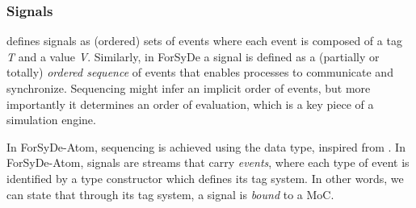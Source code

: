 \subsubsection{Signals}
\cite{Lee98} defines signals as (ordered) sets of events
 where each event is composed of a tag \emph{T} and a value
 \emph{V}. Similarly, in ForSyDe a signal is defined as a (partially or
 totally) \emph{ordered sequence} of events that enables processes to
 communicate and synchronize. Sequencing might infer an implicit
 order of events, but more importantly it determines an order of
 evaluation, which is a key piece of a simulation engine.\par
{}\par
In ForSyDe-Atom, sequencing is achieved using the  data
 type, inspired from \cite{Reekie95}. In ForSyDe-Atom,
 signals are streams that carry \emph{events}, where each type of event
 is identified by a type constructor which defines its tag
 system. In other words, we can state that through its tag system,
 a signal is \emph{bound} to a MoC.\par

